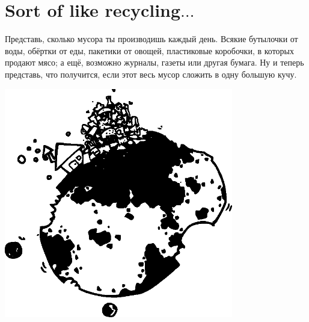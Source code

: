 %
%
%

\chapter{Sort of like recycling$\ldots$}\label{ch:sortoflikerecycling}

Представь, сколько мусора ты производишь каждый день. Всякие бутылочки от воды, обёртки от еды, пакетики от овощей, пластиковые коробочки, в которых продают мясо; а ещё, возможно журналы, газеты или другая бумага. Ну и теперь представь, что получится, если этот весь мусор сложить в одну большую кучу.


\begin{center}
\includegraphics*[width=100mm]{../en/trash.eps}
\end{center}

